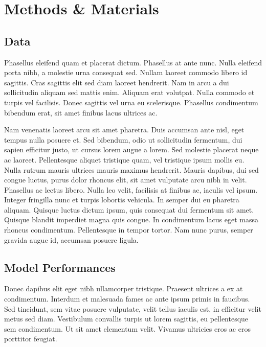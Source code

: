 \documentclass[9pt,biorxiv,doublespacing,lineno]{lapreprint}
\begin{document}
\hypertarget{methods-materials}{%
\section{Methods \& Materials}\label{methods-materials}}

\hypertarget{data}{%
\subsection{Data}\label{data}}

Phasellus eleifend quam et placerat dictum. Phasellus at ante nunc.
Nulla eleifend porta nibh, a molestie urna consequat sed. Nullam laoreet
commodo libero id sagittis. Cras sagittis elit sed diam laoreet
hendrerit. Nam in arcu a dui sollicitudin aliquam sed mattis enim.
Aliquam erat volutpat. Nulla commodo et turpis vel facilisis. Donec
sagittis vel urna eu scelerisque. Phasellus condimentum bibendum erat,
sit amet finibus lacus ultrices ac.

Nam venenatis laoreet arcu sit amet pharetra. Duis accumsan ante nisl,
eget tempus nulla posuere et. Sed bibendum, odio ut sollicitudin
fermentum, dui sapien efficitur justo, ut cursus lorem augue a lorem.
Sed molestie placerat neque ac laoreet. Pellentesque aliquet tristique
quam, vel tristique ipsum mollis eu. Nulla rutrum mauris ultrices mauris
maximus hendrerit. Mauris dapibus, dui sed congue luctus, purus dolor
rhoncus elit, sit amet vulputate arcu nibh in velit. Phasellus ac lectus
libero. Nulla leo velit, facilisis at finibus ac, iaculis vel ipsum.
Integer fringilla nunc et turpis lobortis vehicula. In semper dui eu
pharetra aliquam. Quisque luctus dictum ipsum, quis consequat dui
fermentum sit amet. Quisque blandit imperdiet magna quis congue. In
condimentum lacus eget massa rhoncus condimentum. Pellentesque in tempor
tortor. Nam nunc purus, semper gravida augue id, accumsan posuere
ligula.

\hypertarget{model-performances}{%
\subsection{Model Performances}\label{model-performances}}

Donec dapibus elit eget nibh ullamcorper tristique. Praesent ultrices a
ex at condimentum. Interdum et malesuada fames ac ante ipsum primis in
faucibus. Sed tincidunt, sem vitae posuere vulputate, velit tellus
iaculis est, in efficitur velit metus sed diam. Vestibulum convallis
turpis ut lorem sagittis, eu pellentesque sem condimentum. Ut sit amet
elementum velit. Vivamus ultricies eros ac eros porttitor feugiat.
\end{document}
